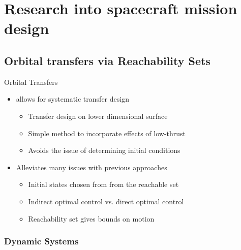 
\section[Prior Research]{Research into spacecraft mission design}
\subsection[Reachability Sets]{Orbital transfers via Reachability Sets}

\begin{frame}{Orbital Transfers} %
    \begin{itemize}
        \item {} allows for systematic transfer design
        \begin{itemize}
            \item Transfer design on lower dimensional \Poincare surface
            \item Simple method to incorporate effects of low-thrust 
            \item Avoids the issue of determining initial conditions
        \end{itemize}
    \pause
        \item Alleviates many issues with previous approaches
        \begin{itemize}
            \item Initial states chosen from from the reachable set
            \item Indirect optimal control vs. direct optimal control
            \item Reachability set gives bounds on motion
        \end{itemize}    
    \end{itemize}

\end{frame} %

\subsubsection[Dynamic Systems Theory Review]{Dynamic Systems}

